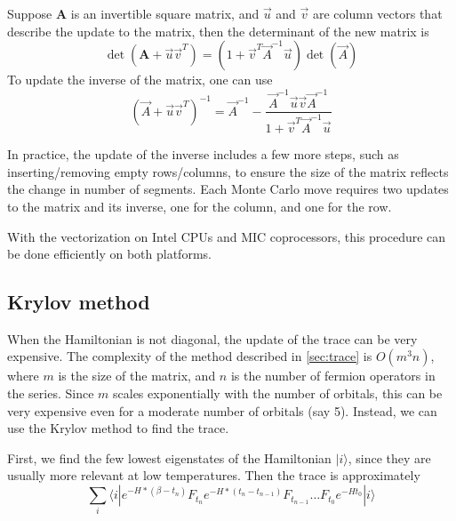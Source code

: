 Suppose $\mathbf A$ is an invertible square matrix, and $\vec{u}$ and $\vec{v}$
are column vectors that describe the update to the matrix, then the determinant
of the new matrix is
\begin{equation}
\det({\mathbf A}+\vec{u}\vec{v}^T)=(1+\vec{v}^T\vec{A}^{-1}\vec{u})\det(\vec{A})
\end{equation}
To update the inverse of the matrix, one can use
\begin{equation}
(\vec{A}+\vec{u}\vec{v}^T)^{-1}=\vec{A}^{-1}-
\frac{\vec{A}^{-1}\vec{u}\vec{v}\vec{A}^{-1}}{1+\vec{v}^T\vec{A}^{-1}\vec{u}}
\end{equation}

In practice, the update of the inverse includes a few more steps, such as 
inserting/removing empty rows/columns, to ensure the size of the matrix 
reflects the change in number of segments. Each Monte Carlo move requires two
updates to the matrix and its inverse, one for the column, and one for the row.

With the vectorization on Intel CPUs and MIC coprocessors, this procedure can 
be done efficiently on both platforms.



\subsection{Krylov method}
\label{sec:cthyb_krylov}
When the Hamiltonian is not diagonal, the update of the trace can be very expensive.
 The complexity of the method described in \ref{sec:trace}
 is $O(m^3n)$, where $m$ is the size of the 
matrix, and $n$ is the number of fermion operators in the series. Since $m$ 
scales exponentially with the number of orbitals, this can be 
very expensive even for a moderate number of orbitals (say 5). Instead, we can 
use the Krylov method to find the trace.

First, we find the few lowest eigenstates of the Hamiltonian $|i\rangle$, since 
they are usually more relevant at low temperatures. Then the trace is 
approximately
\[
\sum_i\langle i|  e^{-H*(\beta-t_n)}F_{t_n}e^{-H*(t_n-t_{n-1})}F_{t_{n-1}}
\ldots F_{t_0}e^{-Ht_0}  |i\rangle
\]

